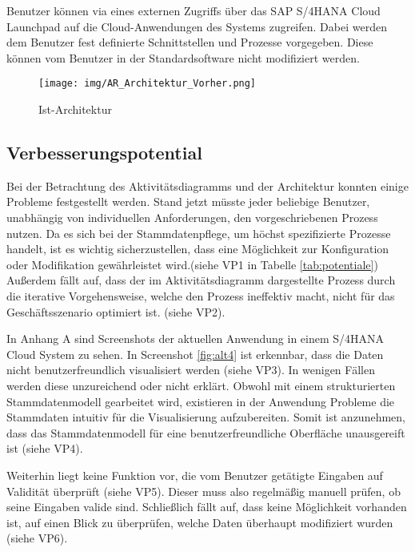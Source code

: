Benutzer können via eines externen Zugriffs über das SAP S/4HANA Cloud Launchpad auf die Cloud-Anwendungen des Systems zugreifen. Dabei werden dem Benutzer fest definierte Schnittstellen und Prozesse vorgegeben. Diese können vom Benutzer in der Standardsoftware nicht modifiziert werden. 

\begin{figure}[H]
	\centering 
	\texttt{[image: img/AR\_Architektur\_Vorher.png]}
	\caption[Ist-Architektur ]
	{\label{fig:architektur_vorher}Ist-Architektur }
\end{figure}
% 
% 
% 
% 
% 
% 
\subsection{Verbesserungspotential}
Bei der Betrachtung des Aktivitätsdiagramms und der Architektur konnten einige Probleme festgestellt werden. Stand jetzt müsste jeder beliebige Benutzer, unabhängig von individuellen Anforderungen, den vorgeschriebenen Prozess nutzen. Da es sich bei der Stammdatenpflege, um höchst spezifizierte Prozesse handelt, ist es wichtig sicherzustellen, dass eine Möglichkeit zur Konfiguration oder Modifikation gewährleistet wird.(siehe VP1 in Tabelle \ref{tab:potentiale}) Außerdem fällt auf, dass der im Aktivitätsdiagramm dargestellte Prozess durch die iterative Vorgehensweise, welche den Prozess ineffektiv macht, nicht für das Geschäftsszenario optimiert ist. (siehe VP2).

In Anhang A sind Screenshots der aktuellen Anwendung in einem S/4HANA Cloud System zu sehen. In Screenshot \ref{fig:alt4} ist erkennbar, dass die Daten nicht benutzerfreundlich visualisiert werden (siehe VP3). In wenigen Fällen werden diese unzureichend oder nicht erklärt. Obwohl mit einem strukturierten Stammdatenmodell gearbeitet wird, existieren in der Anwendung Probleme die Stammdaten intuitiv für die Visualisierung aufzubereiten. Somit ist anzunehmen, dass das Stammdatenmodell für eine benutzerfreundliche Oberfläche unausgereift ist (siehe VP4).

Weiterhin liegt keine Funktion vor, die vom Benutzer getätigte Eingaben auf Validität überprüft (siehe VP5). Dieser muss also regelmäßig manuell prüfen, ob seine Eingaben valide sind. Schließlich fällt auf, dass keine Möglichkeit vorhanden ist, auf einen Blick zu überprüfen, welche Daten überhaupt modifiziert wurden (siehe VP6).


